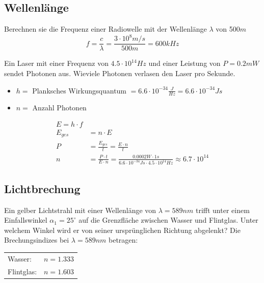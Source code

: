 \subsection{Wellenlänge}
Berechnen sie die Frequenz einer Radiowelle mit der Wellenlänge $\lambda$ von 5$00m$
\[
	f=\frac{c}{\lambda} = \frac{3\cdot 10^8m/s}{500 m} = 600kHz
\]

Ein Laser mit einer Frequenz von $4.5\cdot 10^{14} Hz$ und einer Leistung von $P=0.2mW$ sendet Photonen aus. Wieviele Photonen verlasen den Laser pro Sekunde.
\begin{itemize}
\itemsep0em
\item $h = $ Planksches Wirkungsquantum $=6.6\cdot 10^{-34}\frac{J}{Hz} = 6.6\cdot 10^{-34} Js$
\item $n = $ Anzahl Photonen
\end{itemize}
\begin{align*}
E= h\cdot f\\
E_{ges} &= n\cdot E\\
P&= \frac{E_{ges}}{t} = \frac{E\cdot n}{t}\\
n&=\frac{P\cdot t}{E\cdot n} = \frac{0.0002W\cdot 1s}{6.6\cdot 10^{-34}Js\cdot 4.5\cdot10^{14}Hz} \approx 6.7\cdot 10^{14}
\end{align*}

\subsection{Lichtbrechung}
Ein gelber Lichtstrahl mit einer Wellenlänge von $\lambda = 589 nm$ trifft unter einem Einfallswinkel $\alpha_1 = 25^\circ$ auf die Grenzfläche zwischen Wasser und Flintglas. Unter welchem Winkel wird
er von seiner ursprünglichen Richtung abgelenkt? Die Brechungsindizes bei $\lambda = 589 nm$ betragen:\\
\begin{tabular}{ll}
Wasser: &$n = 1.333$\\
Flintglas: &$n = 1.603$
\end{tabular}


